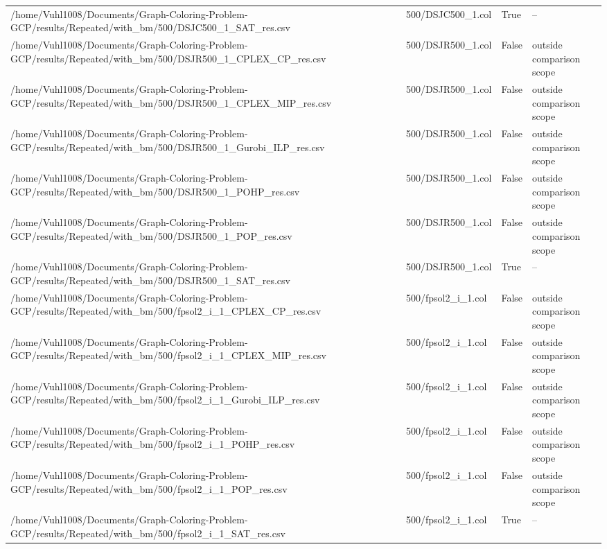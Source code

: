 \begin{table}[htbp]
\begin{tabular}{llll}
/home/Vuhl1008/Documents/Graph-Coloring-Problem-GCP/results/Repeated/with\_bm/500/DSJC500\_1\_SAT\_res.csv & 500/DSJC500\_1.col & True & -- \\
/home/Vuhl1008/Documents/Graph-Coloring-Problem-GCP/results/Repeated/with\_bm/500/DSJR500\_1\_CPLEX\_CP\_res.csv & 500/DSJR500\_1.col & False & outside comparison scope \\
/home/Vuhl1008/Documents/Graph-Coloring-Problem-GCP/results/Repeated/with\_bm/500/DSJR500\_1\_CPLEX\_MIP\_res.csv & 500/DSJR500\_1.col & False & outside comparison scope \\
/home/Vuhl1008/Documents/Graph-Coloring-Problem-GCP/results/Repeated/with\_bm/500/DSJR500\_1\_Gurobi\_ILP\_res.csv & 500/DSJR500\_1.col & False & outside comparison scope \\
/home/Vuhl1008/Documents/Graph-Coloring-Problem-GCP/results/Repeated/with\_bm/500/DSJR500\_1\_POHP\_res.csv & 500/DSJR500\_1.col & False & outside comparison scope \\
/home/Vuhl1008/Documents/Graph-Coloring-Problem-GCP/results/Repeated/with\_bm/500/DSJR500\_1\_POP\_res.csv & 500/DSJR500\_1.col & False & outside comparison scope \\
/home/Vuhl1008/Documents/Graph-Coloring-Problem-GCP/results/Repeated/with\_bm/500/DSJR500\_1\_SAT\_res.csv & 500/DSJR500\_1.col & True & -- \\
/home/Vuhl1008/Documents/Graph-Coloring-Problem-GCP/results/Repeated/with\_bm/500/fpsol2\_i\_1\_CPLEX\_CP\_res.csv & 500/fpsol2\_i\_1.col & False & outside comparison scope \\
/home/Vuhl1008/Documents/Graph-Coloring-Problem-GCP/results/Repeated/with\_bm/500/fpsol2\_i\_1\_CPLEX\_MIP\_res.csv & 500/fpsol2\_i\_1.col & False & outside comparison scope \\
/home/Vuhl1008/Documents/Graph-Coloring-Problem-GCP/results/Repeated/with\_bm/500/fpsol2\_i\_1\_Gurobi\_ILP\_res.csv & 500/fpsol2\_i\_1.col & False & outside comparison scope \\
/home/Vuhl1008/Documents/Graph-Coloring-Problem-GCP/results/Repeated/with\_bm/500/fpsol2\_i\_1\_POHP\_res.csv & 500/fpsol2\_i\_1.col & False & outside comparison scope \\
/home/Vuhl1008/Documents/Graph-Coloring-Problem-GCP/results/Repeated/with\_bm/500/fpsol2\_i\_1\_POP\_res.csv & 500/fpsol2\_i\_1.col & False & outside comparison scope \\
/home/Vuhl1008/Documents/Graph-Coloring-Problem-GCP/results/Repeated/with\_bm/500/fpsol2\_i\_1\_SAT\_res.csv & 500/fpsol2\_i\_1.col & True & -- \\

\end{tabular}
\end{table}
